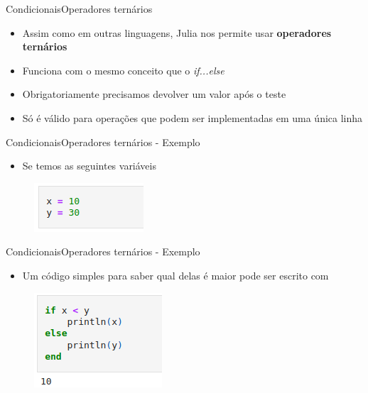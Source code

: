 \documentclass{beamer}
\begin{document}
\begin{frame}{Condicionais}{Operadores ternários}
    \begin{itemize}
        \item Assim como em outras linguagens, Julia nos permite usar \textbf{operadores ternários}
        \item Funciona com o mesmo conceito que o \textit{if...else}
        \item Obrigatoriamente precisamos devolver um valor após o teste
        \item Só é válido para operações que podem ser implementadas em uma única linha 
    \end{itemize}
\end{frame}

\begin{frame}{Condicionais}{Operadores ternários - Exemplo}
    \begin{itemize}
        \item Se temos as seguintes variáveis
    \end{itemize}
    \begin{figure}
        \centering
        \includegraphics[scale=0.5]{imagens/var-if.png}
        \label{fig:my_label}
    \end{figure}  
\end{frame}

\begin{frame}{Condicionais}{Operadores ternários - Exemplo}
    \begin{itemize}
        \item Um código simples para saber qual delas é maior pode ser escrito com
    \end{itemize}
    \begin{figure}
        \centering
        \includegraphics[scale=0.5]{imagens/if-002.png}
        \label{fig:my_label}
    \end{figure}  
\end{frame}
\end{document}
